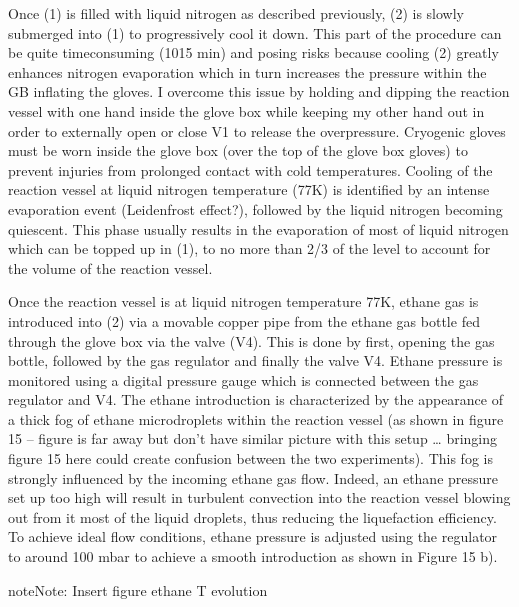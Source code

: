 \documentclass[letterpaper,10pt,english]{jupyterBook}
\begin{document}
\sphinxAtStartPar
Once (1) is filled with liquid nitrogen as described previously, (2) is slowly submerged into (1) to progressively cool it down. This part of the procedure can be quite time\sphinxhyphen{}consuming (10\sphinxhyphen{}15 min) and posing risks because cooling (2) greatly enhances nitrogen evaporation which in turn increases the pressure within the GB inflating the gloves. I overcome this issue by holding and dipping the reaction vessel with one hand inside the glove box while keeping my other hand out in order to externally open or close V1 to release the overpressure. Cryogenic gloves must be worn inside the glove box (over the top of the glove box gloves) to prevent injuries from prolonged contact with cold temperatures. Cooling of the reaction vessel at liquid nitrogen temperature (77K) is identified by an intense evaporation event (Leidenfrost effect?), followed by the liquid nitrogen becoming quiescent. This phase usually results in the evaporation of most of liquid nitrogen which can be topped up in (1), to no more than 2/3 of the level to account for the volume of the reaction vessel.

\sphinxAtStartPar
Once the reaction vessel is at liquid nitrogen temperature 77K, ethane gas is introduced into (2) via a movable copper pipe from the ethane gas bottle fed through the glove box via the valve (V4). This is done by first, opening the gas bottle, followed by the gas regulator and finally the valve V4. Ethane pressure is monitored using a digital pressure gauge which is connected between the gas regulator and V4.
The ethane introduction is characterized by the appearance of a thick fog of ethane microdroplets within the reaction vessel (as shown in figure 15 – figure is far away but don’t have similar picture with this setup … \sphinxhyphen{} bringing figure 15 here could create confusion between the two experiments). This fog is strongly influenced by the incoming ethane gas flow. Indeed, an ethane pressure set up too high will result in turbulent convection into the reaction vessel blowing out from it most of the liquid droplets, thus reducing the liquefaction efficiency.
To achieve ideal flow conditions, ethane pressure is adjusted using the regulator to around 100 mbar to achieve a smooth introduction as shown in Figure 15 b).

\begin{sphinxadmonition}{note}{Note:}
\sphinxAtStartPar
Insert figure ethane T evolution
\end{sphinxadmonition}
\end{document}
